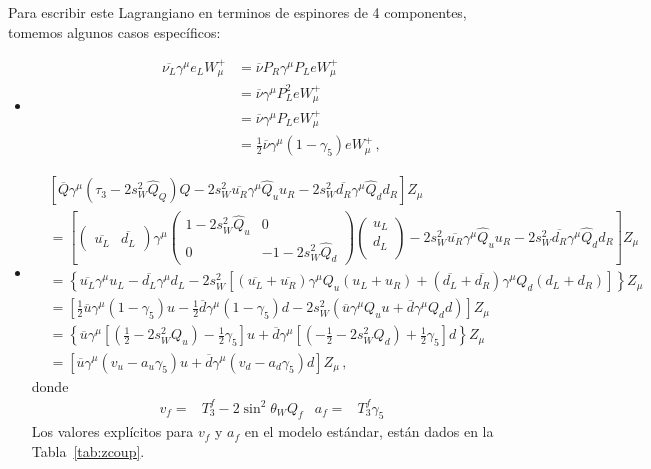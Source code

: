 \begin{frame}
Para escribir este Lagrangiano en terminos de espinores de 4 componentes, tomemos algunos casos específicos:
\begin{itemize}
\item 
\begin{align}
\label{eq:wf4}
  \overline{\nu_L}\gamma^\mu e_LW_\mu^+&=\overline{\nu}P_R\gamma^\mu P_LeW_\mu^+\nonumber\\
&=\overline{\nu}\gamma^\mu P_L^2eW_\mu^+\nonumber\\
&=\overline{\nu}\gamma^\mu P_LeW_\mu^+\nonumber\\
&=\frac{1}{2}\overline{\nu}\gamma^\mu(1-\gamma_5)eW_\mu^+\,,
\end{align}

\item
  \begin{align}
\label{eq:zf4}
    &\left[\overline{Q}\gamma^\mu\left( \tau_3-2s_W^2\widehat{Q}_Q\right)Q
      -2s_W^2\overline{u_R}\gamma^\mu\widehat{Q}_u u_R-2s_W^2\overline{d_R}\gamma^\mu\widehat{Q}_d d_R\right]Z_\mu\nonumber\\
&=\left[\begin{pmatrix}
      \overline{u_L} &\overline{d_L}
    \end{pmatrix}\gamma^\mu
    \begin{pmatrix}
      1-2s_W^2\widehat{Q}_u & 0\\
      0 &-1-2s_W^2\widehat{Q}_d
    \end{pmatrix}
    \begin{pmatrix}
      u_L\\
      d_L\\
    \end{pmatrix}
    -2s_W^2\overline{u_R}\gamma^\mu\widehat{Q}_u u_R-2s_W^2\overline{d_R}\gamma^\mu\widehat{Q}_d d_R
  \right]Z_\mu\nonumber\\
    &=\left\{\overline{u_L}\gamma^\mu u_L-\overline{d_L}\gamma^\mu d_L
-2s_W^2\left[\left(\overline{u_L}+\overline{u_R}\right)\gamma^\mu Q_u\left(u_L+u_R\right)
+\left(\overline{d_L}+\overline{d_R}\right)\gamma^\mu Q_d\left(d_L+d_R\right)
\right]\right\}Z_\mu \nonumber\\
        &=\left[\frac{1}{2}\overline{u}\gamma^\mu(1-\gamma_5)u-\frac{1}{2}\overline{d}\gamma^\mu(1-\gamma_5)d
-2s_W^2\left(\overline{u}\gamma^\mu Q_u u
+\overline{d}\gamma^\mu Q_d d
\right)\right]Z_\mu\nonumber\\
        &=\left\{\overline{u}\gamma^\mu\left[\left(\frac{1}{2}-2s_W^2Q_u\right)-\frac{1}{2}\gamma_5\right]u+
\overline{d}\gamma^\mu\left[\left(-\frac{1}{2}-2s_W^2Q_d\right)+\frac{1}{2}\gamma_5\right]d
\right\}Z_\mu\nonumber\\
  &=\left[\overline{u}\gamma^\mu\left(v_u-a_u\gamma_5\right)u+\overline{d}\gamma^\mu\left(v_d-a_d\gamma_5\right)d\right]Z_\mu\,,
  \end{align}
donde
\begin{align}
  v_f=&T_3^f-2 \sin^2\theta_WQ_f & a_f=&T_3^f \gamma_5
\end{align}
Los valores explícitos para  $v_f$ y $a_f$ en el modelo estándar, están dados en la Tabla~\ref{tab:zcoup}. 
\end{itemize}



\end{frame}
